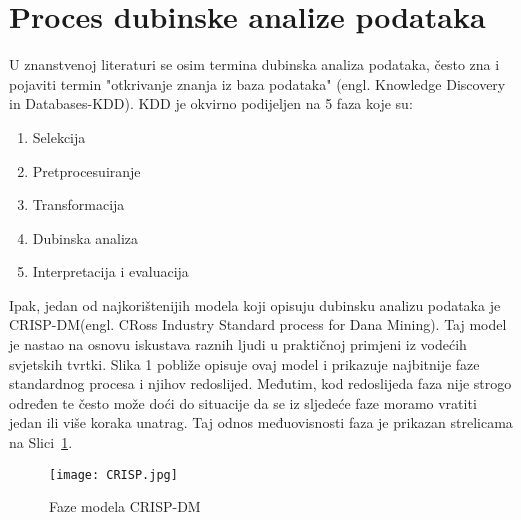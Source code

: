 \documentclass[times, utf8, zavrsni, numeric]{fer}
\begin{document}
\section{Proces dubinske analize podataka}
U znanstvenoj literaturi se osim termina dubinska analiza podataka, često zna i pojaviti termin "otkrivanje znanja iz baza podataka" (engl. Knowledge Discovery in Databases-KDD). KDD je okvirno podijeljen na 5 faza koje su:
\begin{enumerate}
\item Selekcija
\item Pretprocesuiranje
\item Transformacija
\item Dubinska analiza
\item Interpretacija i evaluacija
\end{enumerate}
Ipak, jedan od najkorištenijih modela koji opisuju dubinsku analizu podataka je CRISP-DM(engl. CRoss Industry Standard process for Dana Mining). Taj model je nastao na osnovu iskustava raznih ljudi u praktičnoj primjeni iz vodećih svjetskih tvrtki. Slika 1 pobliže opisuje ovaj model i prikazuje najbitnije faze standardnog procesa i njihov redoslijed. Međutim, kod redoslijeda faza nije strogo određen te često može doći do situacije da se iz sljedeće faze moramo vratiti jedan ili više koraka unatrag. Taj odnos međuovisnosti faza je prikazan strelicama na Slici~\ref{fig:crisp-dm}.

\begin{figure}[htb]
\centering
\texttt{[image: CRISP.jpg]}
\caption{Faze modela CRISP-DM\cite{m3}}
\label{fig:crisp-dm}
\end{figure}
\newpage
\end{document}
